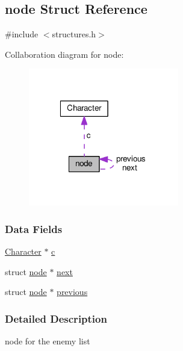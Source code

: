 \hypertarget{structnode}{\subsection{node Struct Reference}
\label{structnode}
}


{\ttfamily \#include $<$structures.\-h$>$}



Collaboration diagram for node\-:
\nopagebreak
\begin{figure}[H]
\begin{center}
\leavevmode
\includegraphics[width=186pt]{structnode__coll__graph}
\end{center}
\end{figure}
\subsubsection*{Data Fields}
\begin{DoxyCompactItemize}
\item 
\hyperlink{struct_character}{Character} $\ast$ \hyperlink{structnode_af76e20a507ad8fd205b860bab7ba4416}{c}
\item 
struct \hyperlink{structnode}{node} $\ast$ \hyperlink{structnode_a0dc1b6470487aa86d9936e3cab8b95be}{next}
\item 
struct \hyperlink{structnode}{node} $\ast$ \hyperlink{structnode_aba783da56f092df6846bd3b7b9555728}{previous}
\end{DoxyCompactItemize}


\subsubsection{Detailed Description}
node for the enemy list 

